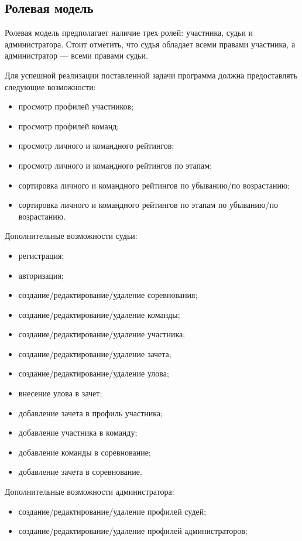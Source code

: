 \newpage


\subsection{Ролевая модель}

Ролевая модель предполагает наличие трех ролей: участника, судьи и администратора. Стоит отметить, что судья обладает всеми правами участника, а администратор --- всеми правами судьи.

Для успешной реализации поставленной задачи программа должна предоставлять следующие возможности:
\begin{itemize}[label=---]
	\item просмотр профилей участников;
	\item просмотр профилей команд;
	\item просмотр личного и командного рейтингов;
	\item просмотр личного и командного рейтингов по этапам;
	\item сортировка личного и командного рейтингов по убыванию/по возрастанию;
	\item сортировка личного и командного рейтингов по этапам по убыванию/по возрастанию.
\end{itemize}

Дополнительные возможности судьи:
\begin{itemize}[label=---]
	\item регистрация;
	\item авторизация;
	\item создание/редактирование/удаление соревнования;
	\item создание/редактирование/удаление команды;
	\item создание/редактирование/удаление участника;
	\item создание/редактирование/удаление зачета;
	\item создание/редактирование/удаление улова;
	\item внесение улова в зачет;
	\item добавление зачета в профиль участника;
	\item добавление участника в команду;
	\item добавление команды в соревнование;
	\item добавление зачета в соревнование.
\end{itemize}

Дополнительные возможности администратора:
\begin{itemize}[label=---]
	\item создание/редактирование/удаление профилей судей;
	\item создание/редактирование/удаление профилей администраторов;
\end{itemize}


